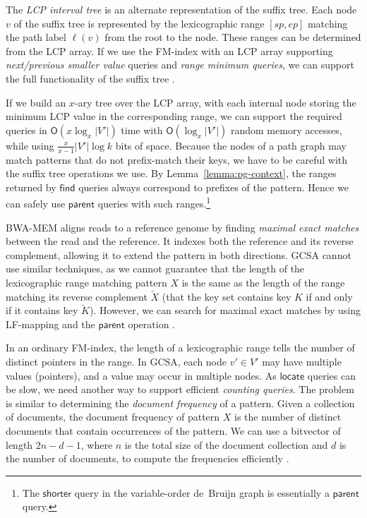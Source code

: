\documentclass[twoside,leqno,twocolumn]{article}
\newcommand{\abs}[1]{\ensuremath{\lvert #1 \rvert}}
\newcommand{\Oh}[1]{\ensuremath{\mathsf{O}\!\left( #1 \right)}}
\newcommand{\revcomp}[1]{\ensuremath{\overleftarrow{#1}}}
\newcommand{\find}{\ensuremath{\mathsf{find}}}
\newcommand{\locate}{\ensuremath{\mathsf{locate}}}
\newcommand{\parent}{\ensuremath{\mathsf{parent}}}
\newcommand{\LFmapping}{LF\nobreakdash-mapping}
\begin{document}
The \emph{LCP interval tree} \cite{Abouelhoda2004} is an alternate representation of the suffix tree. Each node $v$ of the suffix tree is represented by the lexicographic range $[sp, ep]$ matching the path label $\ell(v)$ from the root to the node. These ranges can be determined from the LCP array. If we use the FM\nobreakdash-index with an LCP array supporting \emph{next/previous smaller value} queries and \emph{range minimum queries}, we can support the full functionality of the suffix tree \cite{Fischer2009a}.

If we build an $x$\nobreakdash-ary tree over the LCP array, with each internal node storing the minimum LCP value in the corresponding range, we can support the required queries in $\Oh{x \log_{x} \abs{V'}}$ time with $\Oh{\log_{x} \abs{V'}}$ random memory accesses, while using $\frac{x}{x-1} \abs{V'} \log k$ bits of space. Because the nodes of a path graph may match patterns that do not prefix-match their keys, we have to be careful with the suffix tree operations we use. By Lemma~\ref{lemma:pg-context}, the ranges returned by $\find$ queries always correspond to prefixes of the pattern. Hence we can safely use $\parent$ queries with such ranges.\footnote{The $\textsf{shorter}$ query in the variable-order de~Bruijn graph \cite{Boucher2014} is essentially a $\parent$ query.}

BWA-MEM \cite{Li2013} aligns reads to a reference genome by finding \emph{maximal exact matches} between the read and the reference. It indexes both the reference and its reverse complement, allowing it to extend the pattern in both directions. GCSA cannot use similar techniques, as we cannot guarantee that the length of the lexicographic range matching pattern $X$ is the same as the length of the range matching its reverse complement $\revcomp{X}$ (that the key set contains key $K$ if and only if it contains key $\revcomp{K}$). However, we can search for maximal exact matches by using \LFmapping{} and the $\parent$ operation \cite{Ohlebusch2010a}.

In an ordinary FM\nobreakdash-index, the length of a lexicographic range tells the number of distinct pointers in the range. In GCSA, each node $v' \in V'$ may have multiple values (pointers), and a value may occur in multiple nodes. As $\locate$ queries can be slow, we need another way to support efficient \emph{counting queries}. The problem is similar to determining the \emph{document frequency} of a pattern. Given a collection of documents, the document frequency of pattern $X$ is the number of distinct documents that contain occurrences of the pattern. We can use a bitvector of length $2n-d-1$, where $n$ is the total size of the document collection and $d$ is the number of documents, to compute the frequencies efficiently \cite{Sadakane2007a}.
\end{document}
